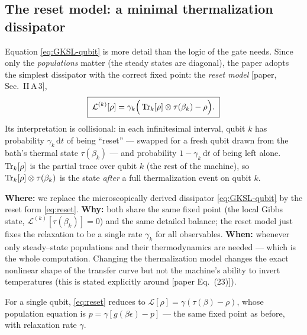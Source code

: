 \documentclass[11pt,a4paper]{article}
\renewcommand{\dd}{\mathrm{d}}
\newcommand{\calL}{\mathcal{L}}
\theoremstyle{definition}
\theoremstyle{remark}
\begin{document}
\subsection{The reset model: a minimal thermalization dissipator}
\label{sec:reset}
Equation \eqref{eq:GKSL-qubit} is more detail than the logic of the gate
needs. Since only the \emph{populations} matter (the steady states are
diagonal), the paper adopts the simplest dissipator with the correct
fixed point: the \emph{reset model} [paper, Sec.~II\,A\,3],
\begin{equation}
\boxed{\;
\calL^{(k)}[\rho] = \gamma_k\Big(\Tr_k[\rho]\otimes\tau(\beta_k)
- \rho\Big).
\;}
\label{eq:reset}
\end{equation}
Its interpretation is collisional: in each infinitesimal interval, qubit
$k$ has probability $\gamma_k\,\dd t$ of being ``reset'' --- swapped for a
fresh qubit drawn from the bath's thermal state $\tau(\beta_k)$ ---
and probability $1-\gamma_k\,\dd t$ of being left alone. $\Tr_k[\rho]$
is the partial trace over qubit $k$ (the rest of the machine), so
$\Tr_k[\rho]\otimes\tau(\beta_k)$ is the state \emph{after} a full
thermalization event on qubit $k$.

\begin{approxbox}
\textbf{Where:} we replace the microscopically derived dissipator
\eqref{eq:GKSL-qubit} by the reset form \eqref{eq:reset}.
\textbf{Why:} both share the same fixed point (the local Gibbs state,
$\calL^{(k)}[\tau(\beta_k)]=0$) and the same detailed balance; the reset
model just fixes the relaxation to be a single rate $\gamma_k$ for all
observables. \textbf{When:} whenever only steady--state populations and
their thermodynamics are needed --- which is the whole computation.
Changing the thermalization model changes the exact nonlinear shape of
the transfer curve but not the machine's ability to invert
temperatures (this is stated explicitly around [paper Eq.~(23)]).
\end{approxbox}

For a single qubit, \eqref{eq:reset} reduces to
$\calL[\rho]=\gamma(\tau(\beta)-\rho)$, whose population equation is
$\dot p=\gamma[g(\beta\epsilon)-p]$ --- the same fixed point as before,
with relaxation rate $\gamma$.
\end{document}
